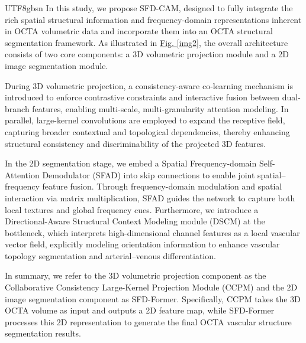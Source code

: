 \documentclass[times, review, 10pt]{elsarticle}
\begin{document}
\begin{CJK}{UTF8}{gbsn}
In this study, we propose SFD-CAM, designed to fully integrate the rich spatial structural information and frequency-domain representations inherent in OCTA volumetric data and incorporate them into an OCTA structural segmentation framework. As illustrated in \hyperref[img2]{Fig. \ref*{img2}}, the overall architecture consists of two core components: a 3D volumetric projection module and a 2D image segmentation module.
\par
During 3D volumetric projection, a consistency-aware co-learning mechanism is introduced to enforce contrastive constraints and interactive fusion between dual-branch features, enabling multi-scale, multi-granularity attention modeling. In parallel, large-kernel convolutions are employed to expand the receptive field, capturing broader contextual and topological dependencies, thereby enhancing structural consistency and discriminability of the projected 3D features.
\par
In the 2D segmentation stage, we embed a Spatial Frequency-domain Self-Attention Demodulator (SFAD) into skip connections to enable joint spatial–frequency feature fusion. Through frequency-domain modulation and spatial interaction via matrix multiplication, SFAD guides the network to capture both local textures and global frequency cues. Furthermore, we introduce a Directional-Aware Structural Context Modeling module (DSCM) at the bottleneck, which interprets high-dimensional channel features as a local vascular vector field, explicitly modeling orientation information to enhance vascular topology segmentation and arterial–venous differentiation.
\par
In summary, we refer to the 3D volumetric projection component as the Collaborative Consistency Large-Kernel Projection Module (CCPM) and the 2D image segmentation component as SFD-Former. Specifically, CCPM takes the 3D OCTA volume as input and outputs a 2D feature map, while SFD-Former processes this 2D representation to generate the final OCTA vascular structure segmentation results.
\par

\end{CJK}
\end{document}
